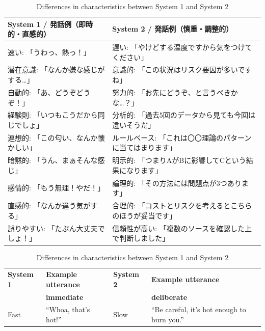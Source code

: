 \documentclass[a4paper]{article}
\begin{document}
\begin{table}[htb]\centering\small
\ifJPN
\caption{システム1とシステム2との特徴の違い}
\else
\caption{Differences in characteristics between System 1 and System 2}
\fi
\label{tab:system1-system2}

\ifJPN
\begin{tabularx}{\textwidth}{
    @{}
    >{\raggedright\arraybackslash}p{60mm}
    >{\raggedright\arraybackslash}X
    @{}
}
\toprule
\textbf{System 1 / 発話例（即時的・直感的）} &
\textbf{System 2 / 発話例（慎重・調整的）} \\
\midrule
速い: 「うわっ、熱っ！」 &
遅い: 「やけどする温度ですから気をつけてください」 \\

潜在意識: 「なんか嫌な感じがする…」 &
意識的: 「この状況はリスク要因が多いですね」 \\

自動的: 「あ、どうぞどうぞ！」 &
努力的: 「お先にどうぞ、と言うべきかな…？」 \\

経験則: 「いつもこうだから同じでしょ」 &
分析的: 「過去5回のデータから見ても今回は違いそうだ」 \\

連想的: 「この匂い、なんか懐かしい」 &
ルールベース: 「これは〇〇理論のパターンに当てはまります」 \\

暗黙的: 「うん、まぁそんな感じ」 &
明示的: 「つまりAがBに影響してCという結果になります」 \\

感情的: 「もう無理！やだ！」 &
論理的: 「その方法には問題点が3つあります」 \\

直感的: 「なんか違う気がする」 &
合理的: 「コストとリスクを考えるとこちらのほうが妥当です」 \\

誤りやすい: 「たぶん大丈夫でしょ！」 &
信頼性が高い: 「複数のソースを確認した上で判断しました」 \\
\end{tabularx}

\else

\begin{tabular}{@{}
>{\raggedright\arraybackslash}p{20mm}
>{\raggedright\arraybackslash}p{42mm}
>{\raggedright\arraybackslash}p{20mm}
>{\raggedright\arraybackslash}p{58mm}
@{}
}

\toprule
\textbf{System 1} &
\textbf{Example utterance} &
\textbf{System 2} &
\textbf{Example utterance} \\
& \textbf{immediate} & & \textbf{deliberate} \\
\midrule
Fast & ``Whoa, that's hot!'' &
Slow & ``Be careful, it's hot enough to burn you.'' \\


\end{tabular}
\end{table}
\end{document}

